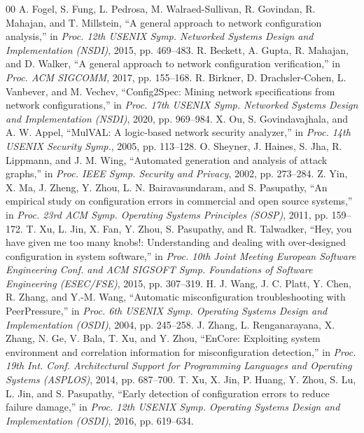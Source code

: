 \documentclass[conference]{IEEEtran}
\begin{document}
\begin{thebibliography}{00}
 A. Fogel, S. Fung, L. Pedrosa, M. Walraed-Sullivan, R. Govindan, R. Mahajan, and T. Millstein, ``A general approach to network configuration analysis,'' in \emph{Proc. 12th USENIX Symp. Networked Systems Design and Implementation (NSDI)}, 2015, pp. 469--483.
 R. Beckett, A. Gupta, R. Mahajan, and D. Walker, ``A general approach to network configuration verification,'' in \emph{Proc. ACM SIGCOMM}, 2017, pp. 155--168.
 R. Birkner, D. Drachsler-Cohen, L. Vanbever, and M. Vechev, ``Config2Spec: Mining network specifications from network configurations,'' in \emph{Proc. 17th USENIX Symp. Networked Systems Design and Implementation (NSDI)}, 2020, pp. 969--984.
 X. Ou, S. Govindavajhala, and A. W. Appel, ``MulVAL: A logic-based network security analyzer,'' in \emph{Proc. 14th USENIX Security Symp.}, 2005, pp. 113--128.
 O. Sheyner, J. Haines, S. Jha, R. Lippmann, and J. M. Wing, ``Automated generation and analysis of attack graphs,'' in \emph{Proc. IEEE Symp. Security and Privacy}, 2002, pp. 273--284.
 Z. Yin, X. Ma, J. Zheng, Y. Zhou, L. N. Bairavasundaram, and S. Pasupathy, ``An empirical study on configuration errors in commercial and open source systems,'' in \emph{Proc. 23rd ACM Symp. Operating Systems Principles (SOSP)}, 2011, pp. 159--172.
 T. Xu, L. Jin, X. Fan, Y. Zhou, S. Pasupathy, and R. Talwadker, ``Hey, you have given me too many knobs!: Understanding and dealing with over-designed configuration in system software,'' in \emph{Proc. 10th Joint Meeting European Software Engineering Conf. and ACM SIGSOFT Symp. Foundations of Software Engineering (ESEC/FSE)}, 2015, pp. 307--319.
 H. J. Wang, J. C. Platt, Y. Chen, R. Zhang, and Y.-M. Wang, ``Automatic misconfiguration troubleshooting with PeerPressure,'' in \emph{Proc. 6th USENIX Symp. Operating Systems Design and Implementation (OSDI)}, 2004, pp. 245--258.
 J. Zhang, L. Renganarayana, X. Zhang, N. Ge, V. Bala, T. Xu, and Y. Zhou, ``EnCore: Exploiting system environment and correlation information for misconfiguration detection,'' in \emph{Proc. 19th Int. Conf. Architectural Support for Programming Languages and Operating Systems (ASPLOS)}, 2014, pp. 687--700.
 T. Xu, X. Jin, P. Huang, Y. Zhou, S. Lu, L. Jin, and S. Pasupathy, ``Early detection of configuration errors to reduce failure damage,'' in \emph{Proc. 12th USENIX Symp. Operating Systems Design and Implementation (OSDI)}, 2016, pp. 619--634.

\end{thebibliography}
\end{document}

